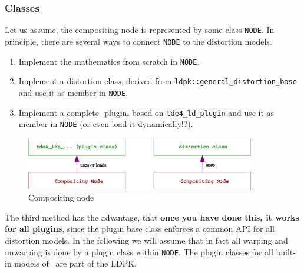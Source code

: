 \documentclass[10pt,a4paper]{article}
\begin{document}
\subsubsection{Classes}
Let us assume, the compositing node is represented by some class {\tt NODE}.
In principle, there are several ways to connect {\tt NODE} to the distortion models.
\begin{enumerate}
\item Implement the mathematics from scratch in {\tt NODE}.
\item Implement a distortion class, derived from {\tt ldpk::general\_distortion\_base}
and use it as member in {\tt NODE}.
\item Implement a complete \tde-plugin, based on {\tt tde4\_ld\_plugin}
and use it as member in {\tt NODE} (or even load it dynamically!?).
\end{enumerate}
\begin{figure}[ht]
\centering
\includegraphics[width=10cm]{compositing_node_classes.eps}
\caption{Compositing node}
\label{fig:CompositingNodeClasses}
\end{figure}
The third method has the advantage, that {\bf once you have done this, it works for all plugins},
since the plugin base class enforces a common API for all distortion models.
In the following we will assume that in fact all warping and unwarping is done by a plugin class within {\tt NODE}.
The plugin classes for all built-in models of \tde\ are part of the LDPK.
\end{document}

